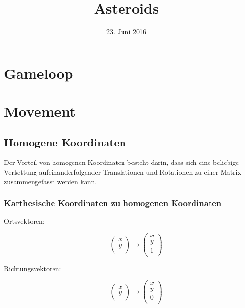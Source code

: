 \documentclass{article}
\title{Asteroids}
\date{23. Juni 2016}
\begin{document}
\maketitle

\section{Gameloop}

\section{Movement}
\subsection{Homogene Koordinaten}
Der Vorteil von homogenen Koordinaten besteht darin,
dass sich eine beliebige Verkettung
aufeinanderfolgender Translationen und Rotationen
zu einer Matrix zusammengefasst werden kann.
\subsubsection{Karthesische Koordinaten zu homogenen Koordinaten}
\begin{description}
 \item[Ortsvektoren:]
  \begin{equation}
   \left(\begin{array}{c}
    x \\
    y \\
   \end{array}\right)
   \rightarrow
   \left(\begin{array}{c}
    x \\
    y \\
    1 \\
   \end{array}\right)
  \end{equation}

 \item[Richtungsvektoren:]
  \begin{equation}
   \left(\begin{array}{c}
    x \\
    y \\
   \end{array}\right)
   \rightarrow
   \left(\begin{array}{c}
    x \\
    y \\
    0 \\
   \end{array}\right)
  \end{equation}
\end{description}
\end{document}
